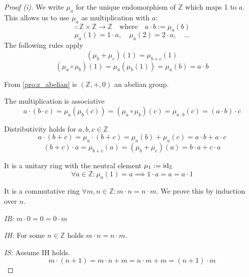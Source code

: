 \begin{proof}[Proof (i)]
   We write \(\mu_a\) for the unique endomorphism of \(\mathbb{Z}\) which maps 1 to \(a\).
   This allows us to use \(\mu_a\) as multiplication with \(a\):
   \[\cdot: \mathbb{Z} \times \mathbb{Z} \to \mathbb{Z} \quad\text{where}\quad a \cdot b := \mu_a(b)\]
   \[\mu_a(1) = 1 \cdot a, \quad \mu_a(2) = 2 \cdot a, \quad\ldots\]
   The following rules apply
   \[(\mu_b + \mu_c)(1) = \mu_{b + c}(1)\]
   \[(\mu_a \circ \mu_b)(1) = \mu_a(\mu_b(1)) = \mu_a(b) = a \cdot b\]

   From \cref{pro:z_abelian} is \((\mathbb{Z}, +, 0)\) an abelian group.

   The multiplication is associative
   \[a \cdot (b \cdot c) = \mu_a(\mu_b(c)) = (\mu_a \circ \mu_b)(c) = \mu_{a \cdot b}(c) = (a \cdot b) \cdot c\]

   Distributivity holds for \(a, b, c \in \mathbb{Z}\)
   \[a \cdot (b + c) = \mu_a \cdot (b + c) = \mu_a(b) + \mu_a(c) = a \cdot b + a \cdot c\]
   \[(b + c) \cdot a = \mu_{b + c}(a) = (\mu_b + \mu_c)(a) = b \cdot a + c \cdot a\]

   It is a unitary ring with the neutral element \(\mu_1 := \operatorname{id}_{\mathbb{Z}}\)
   \[\forall a \in \mathbb{Z}: \mu_a(1) = a \implies 1 \cdot a = a = a \cdot 1\]

   It is a commutative ring \(\forall m, n \in \mathbb{Z}: m \cdot n = n \cdot m\).
   We prove this by induction over \(n\).

   \textit{IB:} \(m \cdot 0 = 0 = 0 \cdot m\)

   \textit{IH:} For some \(n \in \mathbb{Z}\) holds \(m \cdot n = n \cdot m\).

   \textit{IS:} Assume IH holds.
   \[m \cdot (n + 1) = m \cdot n + m = n \cdot m + m = (n + 1) \cdot m\]
\end{proof}

